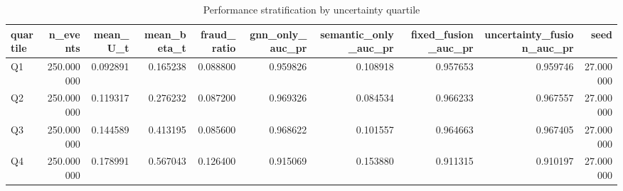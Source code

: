 \begin{table}[t]
\centering
\caption{Performance stratification by uncertainty quartile}
\label{tab:uncertainty_subgroup}
\small
\begin{tabular}{lrrrrrrrrr}
\toprule
quartile & n_events & mean_U_t & mean_beta_t & fraud_ratio & gnn_only_auc_pr & semantic_only_auc_pr & fixed_fusion_auc_pr & uncertainty_fusion_auc_pr & seed \\
\midrule
Q1 & 250.000000 & 0.092891 & 0.165238 & 0.088800 & 0.959826 & 0.108918 & 0.957653 & 0.959746 & 27.000000 \\
Q2 & 250.000000 & 0.119317 & 0.276232 & 0.087200 & 0.969326 & 0.084534 & 0.966233 & 0.967557 & 27.000000 \\
Q3 & 250.000000 & 0.144589 & 0.413195 & 0.085600 & 0.968622 & 0.101557 & 0.964663 & 0.967405 & 27.000000 \\
Q4 & 250.000000 & 0.178991 & 0.567043 & 0.126400 & 0.915069 & 0.153880 & 0.911315 & 0.910197 & 27.000000 \\
\bottomrule
\end{tabular}
\end{table}
